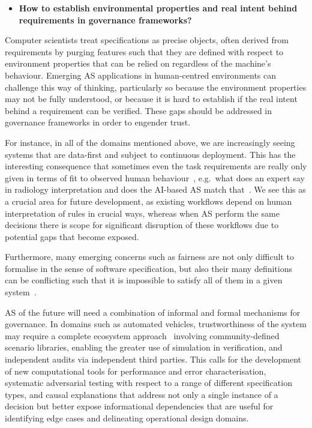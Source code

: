 \documentclass[sigconf,nonacm]{acmart}%
\begin{document}
	\begin{itemize}[leftmargin=0.5cm]
		\item \textbf{How to establish environmental properties and real intent behind requirements in governance frameworks?}
	\end{itemize}
	Computer scientists treat specifications as precise objects, often derived from requirements by purging features such that they are defined with respect to environment properties that can be relied on regardless of the machine's behaviour. Emerging AS applications in human-centred environments can challenge this way of thinking, particularly so because the environment properties may not be fully understood, or because it is hard to establish if the real intent behind a requirement can be verified. These gaps should be addressed in governance frameworks in order to engender trust.
	
	For instance, in all of the domains mentioned above, we are increasingly seeing systems that are data-first and subject to continuous deployment. This has the interesting consequence that sometimes even the task requirements are really only given in terms of fit to observed human behaviour~\cite{topol2019high}, e.g.\ what does an expert say in radiology interpretation and does the AI-based AS match that~\cite{Freemann1872}. We see this as a crucial area for future development, as existing workflows depend on human interpretation of rules in crucial ways, whereas when AS perform the same decisions there is scope for significant disruption of these workflows due to potential gaps that become exposed.

	Furthermore, many emerging concerns such as fairness are not only difficult to formalise in the sense of software specification, but also their many definitions can be conflicting such that it is impossible to satisfy all of them in a given system~\cite{narayanan21fairness}. 
	
	AS of the future will need a combination of informal and formal mechanisms for governance. In domains such as automated vehicles, trustworthiness of the system may require a complete ecosystem approach~\cite{koopman2019certification} involving community-defined scenario libraries, enabling the greater use of simulation in verification, and independent audits via independent third parties. This calls for the development of new computational tools for performance and error characterisation, systematic adversarial testing with respect to a range of different specification types, and causal explanations that address not only a single instance of a decision but better expose informational dependencies that are useful for identifying edge cases and delineating operational design domains. 
	
\end{document}
